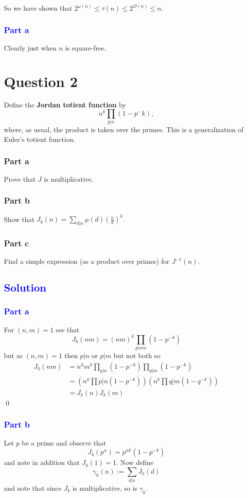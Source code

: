 \documentclass{unswmaths}
\begin{document}
So we have shown that $ 2^{\omega(n)} \leq \tau(n) \leq 2^{\Omega(n)} \leq n $.

\subsubsection*{\textcolor{blue}{Part a}}
Clearly just when $ n $ is square-free.

\hrulefill

\section*{Question 2}
Define the \textbf{Jordan totient function} by 
$$
    n^k\prod_{p|n}(1-p^-k),
$$
where, as usual, the product is taken over the primes. This is a generalization of Euler's
totient function.
\subsubsection*{Part a}
Prove that $ J $ is multiplicative.
\subsubsection*{Part b}
Show that $ J_k(n) = \sum_{d|n} \mu(d) (\frac{n}{d})^k. $
\subsubsection*{Part c}
Find a simple expression (as a product over primes) for $ J^{-1}(n) $.

\hrulefill
\subsection*{\textcolor{blue}{Solution}}
\subsubsection*{\textcolor{blue}{Part a}}
For $ (n,m) = 1 $ see that
$$
    J_k(nm) = (nm)^k \prod_{p|nm} (1-p^{-k})
$$
but as $ (n,m) = 1 $ then $ p | n $ or $ p | m $ but not both so
\begin{align*}
    J_k(nm) &= n^k m^k \prod_{p|n} (1-p^{-k})\prod_{p|m} (1-p^{-k}) \\
        &= \left( n^k \prod{p|n}(1-p^{-k}) \right)\left( n^k \prod{q|m}(1-q^{-k}) \right) \\
        &= J_k(n) J_k(m)
\end{align*}
\qed

\subsubsection*{\textcolor{blue}{Part b}}
Let $ p $ be a prime and observe that
$$
    J_k(p^\alpha) = p^{\alpha k }(1- p^{-k})
$$
and note in addition that $ J_k(1) = 1 $.
Now define 
$$
    \gamma_k(n) := \sum_{d|n} J_k(d) 
$$
and note that since $ J_k $ is multiplicative, so is $ \gamma_k $.
\end{document}
